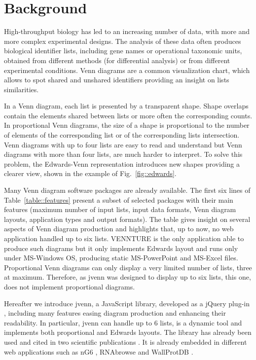 \documentclass{bmcart}
\begin{document}


\section*{Background}

High-throughput biology has led to an increasing number of data, with more and 
more complex experimental designs. The analysis of these data often produces 
biological identifier lists, including gene names or operational
taxonomic units, obtained from different methods (for differential analysis) 
or from different experimental conditions. Venn diagrams \cite{Venn1880} are a 
common visualization chart, which allows to spot shared and unshared identifiers
providing an insight on lists similarities. 

In a Venn diagram, each list is presented by a transparent shape. Shape overlaps
contain the elements shared between lists or more often the corresponding counts.
In proportional Venn diagrams, the size of a shape is proportional to the 
number of elements of the corresponding list or of the corresponding lists
intersection. Venn diagrams with up to four lists are easy to read and
understand but Venn diagrams with more than four lists, are much harder to
interpret. To solve this problem, the Edwards-Venn \cite{Edwards2004}
representation introduces new shapes providing a clearer view, shown in the 
example of Fig.~\ref{fig::edwards}.

Many Venn diagram software packages are already available. The first six lines
of Table~\ref{table::features} present a subset of selected packages with their 
main features (maximum number of input lists, input data formats, Venn diagram 
layouts, application types and output formats). The table gives insight on 
several aspects of Venn diagram production and highlights that, up to now, no
web application handled up to six lists. VENNTURE \cite{Bronwen2012} is the only
application able to produce such diagrams but it only implements Edwards layout
and runs only under MS-Windows OS, producing static MS-PowerPoint and MS-Excel
files. Proportional Venn diagrams can only display a very limited number of lists,
three at maximum. Therefore, as jvenn was designed to display up to six lists, 
this one, does not implement proportional diagrams.

Hereafter we introduce jvenn, a JavaScript library, developed as a jQuery
plug-in \cite{jquery}, including many features easing diagram production and
enhancing their readability. In particular, jvenn can handle up to 6 lists, is 
a dynamic tool and implements both proportional and Edwards layouts. The 
library has already been used and cited in two scientific publications
\cite{Bianchia2013, Aravindraja2013}. It is already embedded in different web
applications such as nG6 \cite{Mariette2012}, RNAbrowse \cite{Mariette} and
WallProtDB \cite{SanClemente}.
\end{document}
